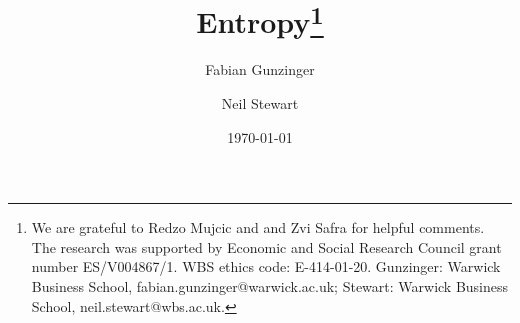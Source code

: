 
\usepackage{/Users/fgu/dev/projects/dotfiles/latex/paper}

\onehalfspacing

\newcommand{\figdir}{../../output/figures}
\newcommand{\tabdir}{../../output/tables}

\title{\textbf{Entropy\footnote{We are grateful to Redzo Mujcic and and Zvi
Safra for helpful comments. The research was supported by Economic and Social
Research Council grant number ES/V004867/1. WBS ethics code: E-414-01-20.
Gunzinger: Warwick Business School, fabian.gunzinger@warwick.ac.uk; Stewart:
Warwick Business School, neil.stewart@wbs.ac.uk.}}}

\author{Fabian Gunzinger \and Neil Stewart}

\date{\today}



\maketitle

% 

\tableofcontents
\newpage













\newpage
\printbibliography

\appendix




